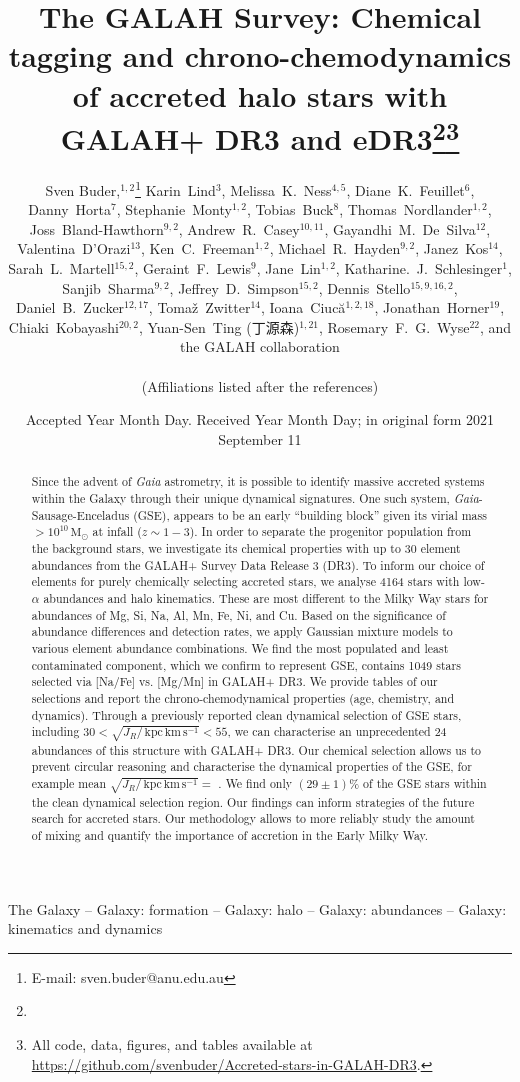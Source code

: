 \documentclass[fleqn,usenatbib]{mnras}
\title[Accreted stars in GALAH+ DR3]{The GALAH Survey: Chemical tagging and chrono-chemodynamics of accreted halo stars with GALAH+ DR3 and \Gaia eDR3\thanks{\added{GALAH+ combines observations based on the main GALAH proposals as well as K2-HERMES, TESS-HERMES, and partner proposals.}}\thanks{All code, data, figures, and tables available at \url{https://github.com/svenbuder/Accreted-stars-in-GALAH-DR3}.}}
\author[S. Buder et al.]{Sven Buder,$^{1,2}$\thanks{E-mail: sven.buder@anu.edu.au}
Karin~Lind$^{3}$, 
Melissa~K.~Ness$^{4,5}$, 
Diane~K.~Feuillet$^{6}$,
Danny~Horta$^{7}$,
Stephanie~Monty$^{1,2}$, \newauthor
Tobias~Buck$^{8}$, 
Thomas~Nordlander$^{1,2}$,
Joss~Bland-Hawthorn$^{9,2}$,
Andrew~R.~Casey$^{10,11}$,\newauthor
Gayandhi~M.~De~Silva$^{12}$,
Valentina~{D'Orazi}$^{13}$,
Ken~C.~Freeman$^{1,2}$, 
Michael~R.~Hayden$^{9,2}$,
Janez~Kos$^{14}$, \newauthor
Sarah~L.~Martell$^{15,2}$, 
Geraint~F.~Lewis$^{9}$,
Jane~Lin$^{1,2}$, 
Katharine.~J.~Schlesinger$^{1}$, 
Sanjib~Sharma$^{9,2}$, \newauthor
Jeffrey~D.~Simpson$^{15,2}$, 
Dennis~Stello$^{15,9,16,2}$,
Daniel~B.~Zucker$^{12,17}$, 
Toma\v{z}~Zwitter$^{14}$,
Ioana~Ciuc\u{a}$^{1,2,18}$,\newauthor
Jonathan~Horner$^{19}$,
Chiaki~Kobayashi$^{20,2}$,
Yuan-Sen~Ting (丁源森)$^{1,21}$,
Rosemary~F.~G.~Wyse$^{22}$, \newauthor
and the GALAH collaboration
\\
\\
(Affiliations listed after the references)}
\date{Accepted Year Month Day. Received Year Month Day; in original form 2021 September 11}
\newcommand{\added}[1]{#1}
\newcommand{\Msol}{\,\mathrm{M_\odot}} %
\newcommand{\kpckms}{\,\mathrm{kpc\,km\,s^{-1}}}	%
\newcommand{\Gaia}{\textit{Gaia}\xspace} %
\begin{document}
\begin{CJK*}{UTF8}{gbsn}
\label{firstpage}
\pagerange{\pageref{firstpage}--\pageref{lastpage}}
\maketitle
\end{CJK*}

\begin{abstract}
Since the advent of \Gaia astrometry, it is possible to identify massive accreted systems within the Galaxy through their unique dynamical signatures. One such system, \Gaia-Sausage-Enceladus (GSE), appears to be an early ``building block'' given its virial mass $> 10^{10}\Msol$ at infall ($z\sim 1-3$). In order to separate the progenitor population from the background stars, we investigate its chemical properties with up to 30 element abundances from the GALAH+ Survey Data Release 3 (DR3). To inform our choice of elements for purely chemically selecting accreted stars, we analyse 4164 stars with low-$\alpha$ abundances and halo kinematics. These are most different to the Milky Way stars for abundances of Mg, Si, Na, Al, Mn, Fe, Ni, and Cu. Based on the significance of abundance differences and detection rates, we apply Gaussian mixture models to various element abundance combinations. We find the most populated and least contaminated component, which we confirm to represent GSE, contains 1049 stars selected via [Na/Fe] vs. [Mg/Mn] in GALAH+ DR3. We provide tables of our selections and report the chrono-chemodynamical properties (age, chemistry, and dynamics). Through a previously reported clean dynamical selection of GSE stars, including $30 < \sqrt{J_R / \kpckms} < 55$, we can characterise an unprecedented 24 abundances of this structure with GALAH+ DR3. Our chemical selection allows us to prevent circular reasoning and characterise the dynamical properties of the GSE, for example mean $\sqrt{J_R / \kpckms} = $ . We find only $(29\pm1)\%$ of the GSE stars within the clean dynamical selection region. \added{Our findings can inform strategies of the future search for accreted stars. Our methodology allows to more reliably study the amount of mixing and quantify the importance of accretion in the Early Milky Way.} \href{https://github.com/svenbuder/Accreted-stars-in-GALAH-DR3}{\faGithub}
\end{abstract}

\begin{keywords}
The Galaxy -- Galaxy: formation -- Galaxy: halo -- Galaxy: abundances -- Galaxy: kinematics and dynamics
\end{keywords}
\end{document}
